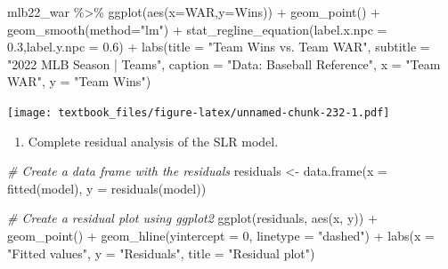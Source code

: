 \documentclass[
  11pt,
]{book}
\newenvironment{Shaded}{\begin{snugshade}}{\end{snugshade}}
\newcommand{\AttributeTok}[1]{\textcolor[rgb]{0.77,0.63,0.00}{#1}}
\newcommand{\CommentTok}[1]{\textcolor[rgb]{0.56,0.35,0.01}{\textit{#1}}}
\newcommand{\DecValTok}[1]{\textcolor[rgb]{0.00,0.00,0.81}{#1}}
\newcommand{\FloatTok}[1]{\textcolor[rgb]{0.00,0.00,0.81}{#1}}
\newcommand{\FunctionTok}[1]{\textcolor[rgb]{0.00,0.00,0.00}{#1}}
\newcommand{\NormalTok}[1]{#1}
\newcommand{\OtherTok}[1]{\textcolor[rgb]{0.56,0.35,0.01}{#1}}
\newcommand{\SpecialCharTok}[1]{\textcolor[rgb]{0.00,0.00,0.00}{#1}}
\newcommand{\StringTok}[1]{\textcolor[rgb]{0.31,0.60,0.02}{#1}}
\providecommand{\tightlist}{%
  \setlength{\itemsep}{0pt}\setlength{\parskip}{0pt}}
\theoremstyle{definition}
\theoremstyle{definition}
\theoremstyle{definition}
\theoremstyle{definition}
\theoremstyle{remark}
\begin{document}
\begin{Shaded}
\begin{Highlighting}[]
\NormalTok{mlb22\_war }\SpecialCharTok{\%\textgreater{}\%} \FunctionTok{ggplot}\NormalTok{(}\FunctionTok{aes}\NormalTok{(}\AttributeTok{x=}\NormalTok{WAR,}\AttributeTok{y=}\NormalTok{Wins)) }\SpecialCharTok{+}
  \FunctionTok{geom\_point}\NormalTok{() }\SpecialCharTok{+}
  \FunctionTok{geom\_smooth}\NormalTok{(}\AttributeTok{method=}\StringTok{"lm"}\NormalTok{) }\SpecialCharTok{+} 
  \FunctionTok{stat\_regline\_equation}\NormalTok{(}\AttributeTok{label.x.npc =} \FloatTok{0.3}\NormalTok{,}\AttributeTok{label.y.npc =} \FloatTok{0.6}\NormalTok{) }\SpecialCharTok{+}
  \FunctionTok{labs}\NormalTok{(}\AttributeTok{title =} \StringTok{"Team Wins vs. Team WAR"}\NormalTok{,}
       \AttributeTok{subtitle =} \StringTok{"2022 MLB Season | Teams"}\NormalTok{,}
       \AttributeTok{caption =} \StringTok{"Data: Baseball Reference"}\NormalTok{, }
       \AttributeTok{x =} \StringTok{"Team WAR"}\NormalTok{,}
       \AttributeTok{y =} \StringTok{"Team Wins"}\NormalTok{)}
\end{Highlighting}
\end{Shaded}

\texttt{[image: textbook\_files/figure-latex/unnamed-chunk-232-1.pdf]}
\newpage

\begin{enumerate}
\def\labelenumi{(\alph{enumi})}
\setcounter{enumi}{3}
\tightlist
\item
  Complete residual analysis of the SLR model.
\end{enumerate}

\begin{Shaded}
\begin{Highlighting}[]
\CommentTok{\# Create a data frame with the residuals}
\NormalTok{residuals }\OtherTok{\textless{}{-}} \FunctionTok{data.frame}\NormalTok{(}\AttributeTok{x =} \FunctionTok{fitted}\NormalTok{(model), }\AttributeTok{y =} \FunctionTok{residuals}\NormalTok{(model))}

\CommentTok{\# Create a residual plot using ggplot2}
\FunctionTok{ggplot}\NormalTok{(residuals, }\FunctionTok{aes}\NormalTok{(x, y)) }\SpecialCharTok{+}
  \FunctionTok{geom\_point}\NormalTok{() }\SpecialCharTok{+}
  \FunctionTok{geom\_hline}\NormalTok{(}\AttributeTok{yintercept =} \DecValTok{0}\NormalTok{, }\AttributeTok{linetype =} \StringTok{"dashed"}\NormalTok{) }\SpecialCharTok{+}
  \FunctionTok{labs}\NormalTok{(}\AttributeTok{x =} \StringTok{"Fitted values"}\NormalTok{, }\AttributeTok{y =} \StringTok{"Residuals"}\NormalTok{, }\AttributeTok{title =} \StringTok{"Residual plot"}\NormalTok{)}
\end{Highlighting}
\end{Shaded}
\end{document}
